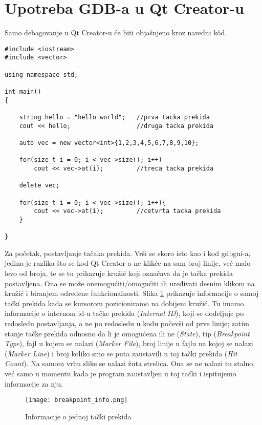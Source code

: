 \documentclass[a4paper]{article}
\begin{document}
\section{Upotreba GDB-a u Qt Creator-u}
\label{upotrebaQT}
Samo debagovanje u Qt Creator-u će biti objašnjeno kroz naredni k\^{o}d.

\begin{lstlisting}[caption={Primer jednostavnog programa za prikaz rada GDB-a u Qt Creator-u},frame=single, label=simple]
#include <iostream>
#include <vector>

using namespace std;

int main()
{

    string hello = "hello world";   //prva tacka prekida
    cout << hello;                  //druga tacka prekida

    auto vec = new vector<int>{1,2,3,4,5,6,7,8,9,10};

    for(size_t i = 0; i < vec->size(); i++)
        cout << vec->at(i);         //treca tacka prekida

    delete vec;

    for(size_t i = 0; i < vec->size(); i++){
        cout << vec->at(i);         //cetvrta tacka prekida
    }

}
\end{lstlisting}

Za početak, postavljanje tačaka prekida. Vrši se skoro isto kao i kod gdbgui-a, jedina je razlika što se kod Qt Creator-a ne klikće na sam broj linije,
već malo levo od broja, te se tu prikazuje kružić koji označava da je
tačka prekida postavljena. Ona se može onemogućiti/omogućiti ili uređivati desnim klikom na kružić i biranjem određene funkcionalnosti.
Slika \ref{fig:point_info} prikazuje informacije o samoj tački prekida kada se
kursorom pozicioniramo na dobijeni kružić. Tu imamo informacije o internom id-u tačke prekida (\textit{Internal ID}), koji se dodeljuje
po redosledu postavljanja, a ne po redosledu u kodu počevši od prve linije; zatim stanje tačke prekida
odnosno da li je omogućena ili ne (\textit{State}), tip (\textit{Breakpoint Type}),
fajl u kojem se nalazi (\textit{Marker File}), broj linije u fajlu na kojoj se nalazi (\textit{Marker Line})
i broj koliko smo se puta zaustavili u toj tački prekida (\textit{Hit Count}).
Na samom vrhu slike se nalazi žuta strelica. Ona se ne nalazi tu stalno, već samo u momentu kada je program 
zaustavljen u toj tački i ispitujemo informacije za nju.

\begin{figure}[h!]
\begin{center}
\texttt{[image: breakpoint\_info.png]}
\end{center}
\caption{Informacije o jednoj tački prekida}
\label{fig:point_info}
\end{figure}
\end{document}
